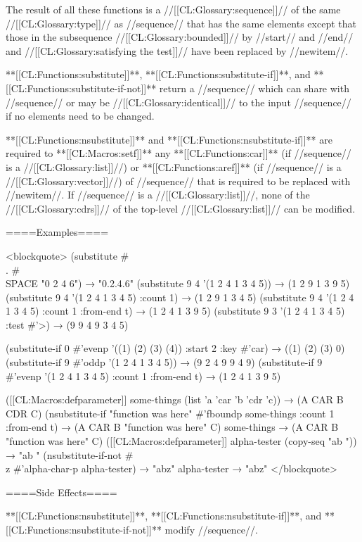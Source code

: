 The result of all these functions is a //[[CL:Glossary:sequence]]// of the same //[[CL:Glossary:type]]// as //sequence// that has the same elements except that those in the subsequence //[[CL:Glossary:bounded]]// by //start// and //end// and //[[CL:Glossary:satisfying the test]]// have been replaced by //newitem//.

**[[CL:Functions:substitute]]**, **[[CL:Functions:substitute-if]]**, and **[[CL:Functions:substitute-if-not]]** return a //sequence// which can share with //sequence// or may be //[[CL:Glossary:identical]]// to the input //sequence// if no elements need to be changed.

**[[CL:Functions:nsubstitute]]** and **[[CL:Functions:nsubstitute-if]]** are required to **[[CL:Macros:setf]]** any **[[CL:Functions:car]]** (if //sequence// is a //[[CL:Glossary:list]]//) or **[[CL:Functions:aref]]** (if //sequence// is a //[[CL:Glossary:vector]]//) of //sequence// that is required to be replaced with //newitem//. If //sequence// is a //[[CL:Glossary:list]]//, none of the //[[CL:Glossary:cdrs]]// of the top-level //[[CL:Glossary:list]]// can be modified.

====Examples====

<blockquote> (substitute #\\. #\\SPACE "0 2 4 6") → "0.2.4.6" (substitute 9 4 '(1 2 4 1 3 4 5)) → (1 2 9 1 3 9 5) (substitute 9 4 '(1 2 4 1 3 4 5) :count 1) → (1 2 9 1 3 4 5) (substitute 9 4 '(1 2 4 1 3 4 5) :count 1 :from-end t) → (1 2 4 1 3 9 5) (substitute 9 3 '(1 2 4 1 3 4 5) :test #'>) → (9 9 4 9 3 4 5)

(substitute-if 0 #'evenp '((1) (2) (3) (4)) :start 2 :key #'car) → ((1) (2) (3) 0) (substitute-if 9 #'oddp '(1 2 4 1 3 4 5)) → (9 2 4 9 9 4 9) (substitute-if 9 #'evenp '(1 2 4 1 3 4 5) :count 1 :from-end t) → (1 2 4 1 3 9 5)

([[CL:Macros:defparameter]] some-things (list 'a 'car 'b 'cdr 'c)) → (A CAR B CDR C) (nsubstitute-if "function was here" #'fboundp some-things :count 1 :from-end t) → (A CAR B "function was here" C) some-things → (A CAR B "function was here" C) ([[CL:Macros:defparameter]] alpha-tester (copy-seq "ab ")) → "ab " (nsubstitute-if-not #\\z #'alpha-char-p alpha-tester) → "abz" alpha-tester → "abz" </blockquote>

====Side Effects====

**[[CL:Functions:nsubstitute]]**, **[[CL:Functions:nsubstitute-if]]**, and **[[CL:Functions:nsubstitute-if-not]]** modify //sequence//.

